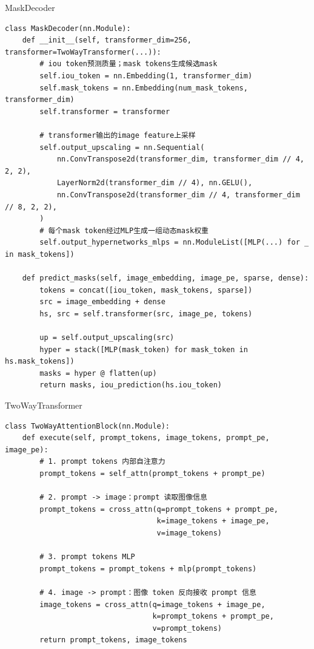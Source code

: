 \begin{frame}[fragile]{MaskDecoder}
\begin{lstlisting}[style=pythoncode,basicstyle=\ttfamily\tiny]
class MaskDecoder(nn.Module):
    def __init__(self, transformer_dim=256, transformer=TwoWayTransformer(...)):
        # iou token预测质量；mask tokens生成候选mask
        self.iou_token = nn.Embedding(1, transformer_dim)
        self.mask_tokens = nn.Embedding(num_mask_tokens, transformer_dim)
        self.transformer = transformer

        # transformer输出的image feature上采样
        self.output_upscaling = nn.Sequential(
            nn.ConvTranspose2d(transformer_dim, transformer_dim // 4, 2, 2),
            LayerNorm2d(transformer_dim // 4), nn.GELU(),
            nn.ConvTranspose2d(transformer_dim // 4, transformer_dim // 8, 2, 2),
        )
        # 每个mask token经过MLP生成一组动态mask权重
        self.output_hypernetworks_mlps = nn.ModuleList([MLP(...) for _ in mask_tokens])

    def predict_masks(self, image_embedding, image_pe, sparse, dense):
        tokens = concat([iou_token, mask_tokens, sparse])
        src = image_embedding + dense
        hs, src = self.transformer(src, image_pe, tokens)

        up = self.output_upscaling(src)
        hyper = stack([MLP(mask_token) for mask_token in hs.mask_tokens])
        masks = hyper @ flatten(up)
        return masks, iou_prediction(hs.iou_token)
\end{lstlisting}
\end{frame}

\begin{frame}[fragile]{TwoWayTransformer}
\begin{lstlisting}[style=pythoncode,basicstyle=\ttfamily\tiny]
class TwoWayAttentionBlock(nn.Module):
    def execute(self, prompt_tokens, image_tokens, prompt_pe, image_pe):
        # 1. prompt tokens 内部自注意力
        prompt_tokens = self_attn(prompt_tokens + prompt_pe)

        # 2. prompt -> image：prompt 读取图像信息
        prompt_tokens = cross_attn(q=prompt_tokens + prompt_pe,
                                   k=image_tokens + image_pe,
                                   v=image_tokens)

        # 3. prompt tokens MLP
        prompt_tokens = prompt_tokens + mlp(prompt_tokens)

        # 4. image -> prompt：图像 token 反向接收 prompt 信息
        image_tokens = cross_attn(q=image_tokens + image_pe,
                                  k=prompt_tokens + prompt_pe,
                                  v=prompt_tokens)
        return prompt_tokens, image_tokens
\end{lstlisting}
\end{frame}

